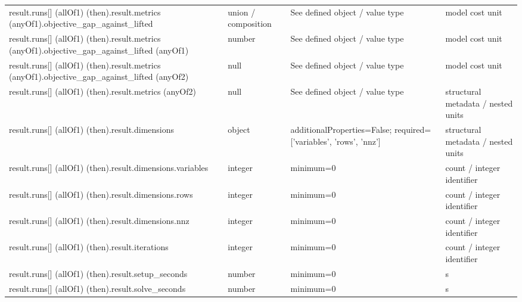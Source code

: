 \begin{longtable}{@{}>{\raggedright\arraybackslash}p{}>{\raggedright\arraybackslash}p{}>{\raggedright\arraybackslash}p{}>{\raggedright\arraybackslash}p{}@{}}
result.\allowbreak{}runs[] (allOf1) (then).\allowbreak{}result.\allowbreak{}metrics (anyOf1).\allowbreak{}objective\_\allowbreak{}gap\_\allowbreak{}against\_\allowbreak{}lifted & union /\allowbreak{} composition & See defined object /\allowbreak{} value type & model cost unit\\
result.\allowbreak{}runs[] (allOf1) (then).\allowbreak{}result.\allowbreak{}metrics (anyOf1).\allowbreak{}objective\_\allowbreak{}gap\_\allowbreak{}against\_\allowbreak{}lifted (anyOf1) & number & See defined object /\allowbreak{} value type & model cost unit\\
result.\allowbreak{}runs[] (allOf1) (then).\allowbreak{}result.\allowbreak{}metrics (anyOf1).\allowbreak{}objective\_\allowbreak{}gap\_\allowbreak{}against\_\allowbreak{}lifted (anyOf2) & null & See defined object /\allowbreak{} value type & model cost unit\\
result.\allowbreak{}runs[] (allOf1) (then).\allowbreak{}result.\allowbreak{}metrics (anyOf2) & null & See defined object /\allowbreak{} value type & structural metadata /\allowbreak{} nested units\\
result.\allowbreak{}runs[] (allOf1) (then).\allowbreak{}result.\allowbreak{}dimensions & object & additionalProperties=\allowbreak{}False; required=\allowbreak{}['variables', 'rows', 'nnz'] & structural metadata /\allowbreak{} nested units\\
result.\allowbreak{}runs[] (allOf1) (then).\allowbreak{}result.\allowbreak{}dimensions.\allowbreak{}variables & integer & minimum=\allowbreak{}0 & count /\allowbreak{} integer identifier\\
result.\allowbreak{}runs[] (allOf1) (then).\allowbreak{}result.\allowbreak{}dimensions.\allowbreak{}rows & integer & minimum=\allowbreak{}0 & count /\allowbreak{} integer identifier\\
result.\allowbreak{}runs[] (allOf1) (then).\allowbreak{}result.\allowbreak{}dimensions.\allowbreak{}nnz & integer & minimum=\allowbreak{}0 & count /\allowbreak{} integer identifier\\
result.\allowbreak{}runs[] (allOf1) (then).\allowbreak{}result.\allowbreak{}iterations & integer & minimum=\allowbreak{}0 & count /\allowbreak{} integer identifier\\
result.\allowbreak{}runs[] (allOf1) (then).\allowbreak{}result.\allowbreak{}setup\_\allowbreak{}seconds & number & minimum=\allowbreak{}0 & s\\
result.\allowbreak{}runs[] (allOf1) (then).\allowbreak{}result.\allowbreak{}solve\_\allowbreak{}seconds & number & minimum=\allowbreak{}0 & s\\

\end{longtable}

